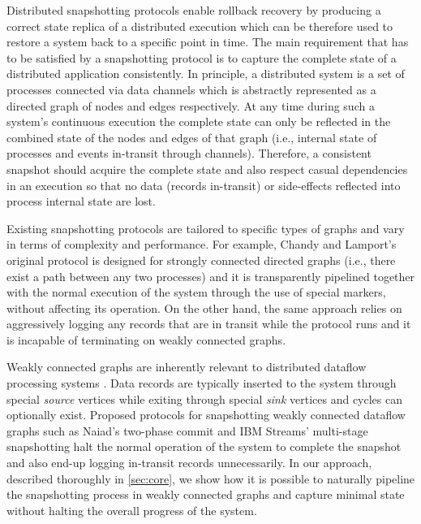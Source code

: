 Distributed snapshotting \cite{chandy1985distributed} protocols enable rollback recovery by producing a correct state replica of a distributed execution which can be therefore used to restore a system back to a specific point in time. The main requirement that has to be satisfied by a snapshotting protocol is to capture the complete state of a distributed application consistently. In principle, a distributed system is a set of processes connected via data channels which is abstractly represented as a directed graph of nodes and edges respectively. At any time during such a system's continuous execution the complete state can only be reflected in the combined state of the nodes and edges of that graph (i.e., internal state of processes and events in-transit through channels). Therefore, a consistent snapshot should acquire the complete state and also respect casual dependencies in an execution so that no data (records in-transit) or side-effects reflected into process internal state are lost. 

Existing snapshotting protocols are tailored to specific types of graphs and vary in terms of complexity and performance. For example, Chandy and Lamport's original protocol \cite{chandy1985distributed} is designed for strongly connected directed graphs (i.e., there exist a path between any two processes) and it is transparently pipelined together with the normal execution of the system through the use of special markers, without affecting its operation. On the other hand, the same approach relies on aggressively logging any records that are in transit while the protocol runs and it is incapable of terminating on weakly connected graphs. 

Weakly connected graphs are inherently relevant to distributed dataflow processing systems \cite{murray2013naiad,jacques2016consistent,millwheel,chambers2010flumejava,castro2013integrating}. Data records are typically inserted to the system through special \emph{source} vertices while exiting through special \emph{sink} vertices and cycles can optionally exist. Proposed protocols for snapshotting weakly connected dataflow graphs such as Naiad's two-phase commit \cite{murray2013naiad} and IBM Streams' multi-stage snapshotting halt the normal operation of the system to complete the snapshot and also end-up logging in-transit records unnecessarily. In our approach, described thoroughly in \autoref{sec:core}, we show how it is possible to naturally pipeline the snapshotting process in weakly connected graphs and capture minimal state without halting the overall progress of the system.

